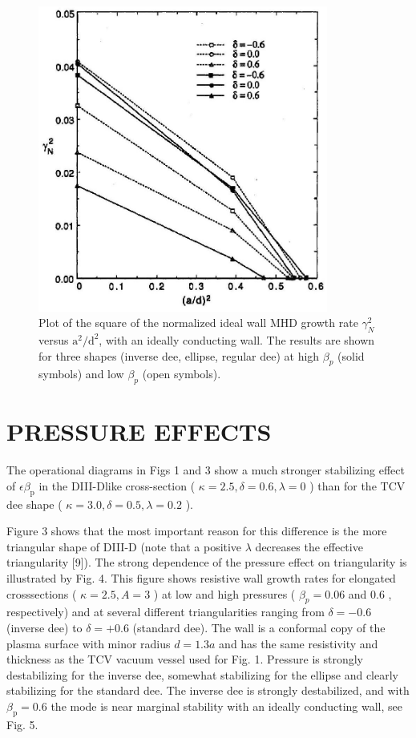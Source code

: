 \documentclass[utf8]{ctexart}
\begin{document}
\begin{sloppypar}
  \begin{figure}[H]
 	\centering
 	\includegraphics[max width=0.85\textwidth,max height=0.3\textheight]{2025_01_10_a0135324997886412d98g-6(1)}
 	\caption{Plot of the square of the normalized ideal wall MHD growth rate $\gamma_{N}^{2}$ versus $\mathrm{a}^{2} / \mathrm{d}^{2}$, with an ideally conducting wall. The results are shown for three shapes (inverse dee, ellipse, regular dee) at high $\beta_{p}$ (solid symbols) and low $\beta_{p}$ (open symbols).}
 	\label{fig}
 \end{figure}

 
 \section{PRESSURE EFFECTS}
 
 The operational diagrams in Figs 1 and 3 show a much stronger stabilizing effect of $\epsilon \beta_{\mathrm{p}}$ in the DIII-Dlike cross-section ( $\kappa=2.5, \delta=0.6, \lambda=0$ ) than for the TCV dee shape ( $\kappa=3.0, \delta=0.5, \lambda=0.2$ ).
 
  Figure 3 shows that the most important reason for this difference is the more triangular shape of DIII-D (note that a positive $\lambda$ decreases the effective triangularity [9]). The strong dependence of the pressure effect on triangularity is illustrated by Fig. 4. This figure shows resistive wall growth rates for elongated crosssections ( $\kappa=2.5, A=3$ ) at low and high pressures ( $\beta_{p}=0.06$ and 0.6 , respectively) and at several different triangularities ranging from $\delta=-0.6$ (inverse dee) to $\delta=+0.6$ (standard dee). The wall is a conformal copy of the plasma surface with minor radius $d=1.3 a$ and has the same resistivity and thickness as the TCV vacuum vessel used for Fig. 1. Pressure is strongly destabilizing for the inverse dee, somewhat stabilizing for the ellipse and clearly stabilizing for the standard dee. The inverse dee is strongly destabilized, and with $\beta_{\mathrm{p}}=0.6$ the mode is near marginal stability with an ideally conducting wall, see Fig. 5.
 

\end{sloppypar}
\end{document}
